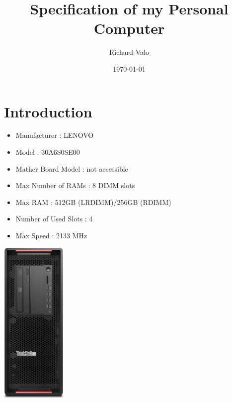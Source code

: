 \documentclass{article}
\title{Specification of my Personal Computer}
\author{Richard Valo}
\date{\today}
\begin{document}
\maketitle

\section{Introduction}
\begin{itemize}
  \item Manufacturer         : LENOVO
  \item Model                : 30A6S0SE00
  \item Mather Board Model   : not accessible
  \item Max Number of RAMs   : 8 DIMM slots
  \item Max RAM              : 512GB (LRDIMM)/256GB (RDIMM)
  \item Number of Used Slots : 4
  \item Max Speed            : 2133 MHz
\end{itemize}
\href{https://www.getech.co.uk/pdf/p5001.pdf}{\includegraphics[height=8cm]{PC.jpg}}
\end{document}
